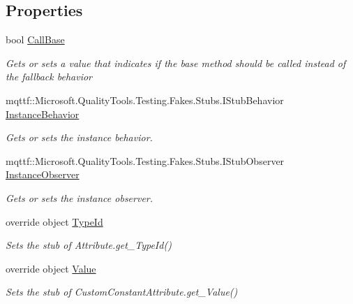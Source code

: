 \subsection*{Properties}
\begin{DoxyCompactItemize}
\item 
bool \hyperlink{class_system_1_1_runtime_1_1_compiler_services_1_1_fakes_1_1_stub_custom_constant_attribute_aa56e73afe5bfe8399547359475178077}{Call\-Base}
\begin{DoxyCompactList}\small\item\em Gets or sets a value that indicates if the base method should be called instead of the fallback behavior\end{DoxyCompactList}\item 
mqttf\-::\-Microsoft.\-Quality\-Tools.\-Testing.\-Fakes.\-Stubs.\-I\-Stub\-Behavior \hyperlink{class_system_1_1_runtime_1_1_compiler_services_1_1_fakes_1_1_stub_custom_constant_attribute_a735abd525fdf96d722bf39f08f0c607e}{Instance\-Behavior}
\begin{DoxyCompactList}\small\item\em Gets or sets the instance behavior.\end{DoxyCompactList}\item 
mqttf\-::\-Microsoft.\-Quality\-Tools.\-Testing.\-Fakes.\-Stubs.\-I\-Stub\-Observer \hyperlink{class_system_1_1_runtime_1_1_compiler_services_1_1_fakes_1_1_stub_custom_constant_attribute_a0f0144532873486319591d0bde9b2f53}{Instance\-Observer}
\begin{DoxyCompactList}\small\item\em Gets or sets the instance observer.\end{DoxyCompactList}\item 
override object \hyperlink{class_system_1_1_runtime_1_1_compiler_services_1_1_fakes_1_1_stub_custom_constant_attribute_a6a2dd33efd85cefb0ff9ec2c7585818e}{Type\-Id}
\begin{DoxyCompactList}\small\item\em Sets the stub of Attribute.\-get\-\_\-\-Type\-Id()\end{DoxyCompactList}\item 
override object \hyperlink{class_system_1_1_runtime_1_1_compiler_services_1_1_fakes_1_1_stub_custom_constant_attribute_a53ae1b82279d082dd4fb3c8378184684}{Value}
\begin{DoxyCompactList}\small\item\em Sets the stub of Custom\-Constant\-Attribute.\-get\-\_\-\-Value()\end{DoxyCompactList}\end{DoxyCompactItemize}


